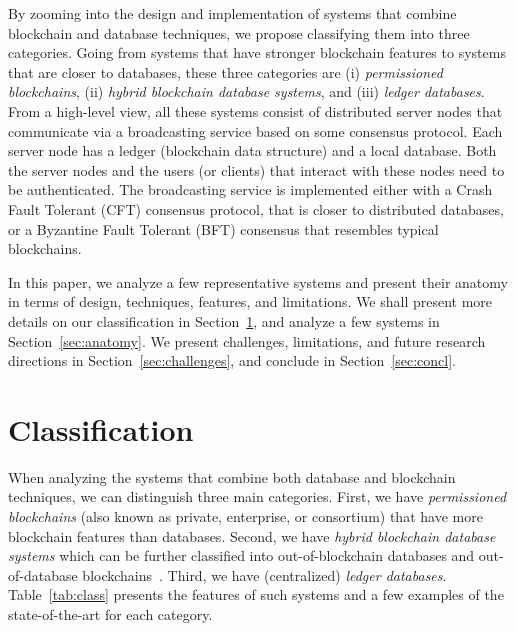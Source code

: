 \documentclass[11pt]{article}
\begin{document}
By zooming into the design and implementation of systems that combine blockchain and database techniques, we propose classifying them into three categories. Going from systems that have stronger blockchain features to systems that are closer to databases, these three categories are (i) \textit{permissioned blockchains}, (ii) \textit{hybrid blockchain database systems}, and (iii) \textit{ledger databases}. From a high-level view, all these systems consist of distributed server nodes that communicate via a broadcasting service based on some consensus protocol. Each server node has a ledger (blockchain data structure) and a local database. Both the server nodes and the users (or clients) that interact with these nodes need to be authenticated. The broadcasting service is implemented either with a Crash Fault Tolerant (CFT) consensus protocol, that is closer to distributed databases, or a Byzantine Fault Tolerant (BFT) consensus that resembles typical blockchains.

In this paper, we analyze a few representative systems and present their anatomy in terms of design, techniques, features, and limitations. We shall present more details on our classification in Section~\ref{sec:class}, and analyze a few systems in Section~\ref{sec:anatomy}. We present challenges, limitations, and future research directions in Section~\ref{sec:challenges}, and conclude in Section~\ref{sec:concl}.


\section{Classification}
\label{sec:class}

When analyzing the systems that combine both database and blockchain techniques, we can distinguish three main categories. First, we have \textit{permissioned blockchains} (also known as private, enterprise, or consortium) that have more blockchain features than databases. Second, we have \textit{hybrid blockchain database systems} which can be further classified into out-of-blockchain databases and out-of-database blockchains~\cite{rpc_sigmod21}. Third, we have (centralized) \textit{ledger databases}. Table~\ref{tab:class} presents the features of such systems and a few examples of the state-of-the-art for each category.
\end{document}
